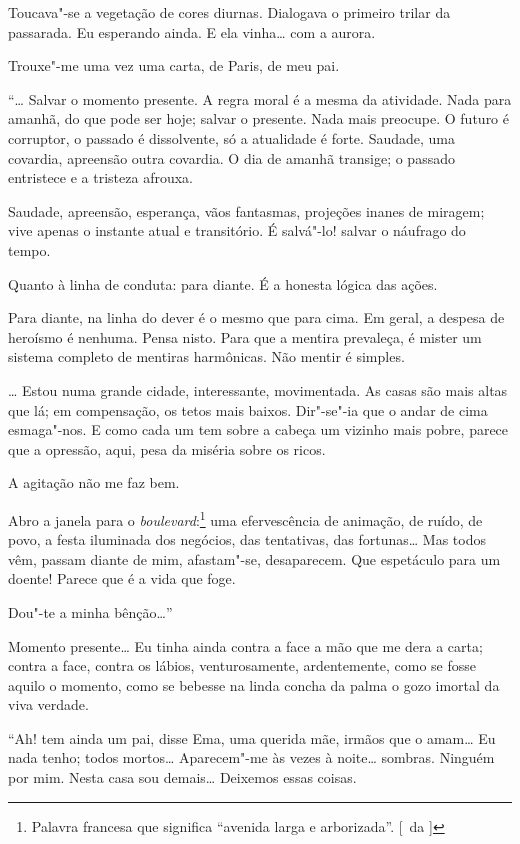 Toucava"-se a vegetação de cores diurnas. Dialogava o primeiro trilar da passarada.
Eu esperando ainda. E ela vinha\ldots{} com a aurora. 

Trouxe"-me uma vez uma carta, de Paris, de meu pai. 

``\ldots{} Salvar o momento presente. A regra moral é a
mesma da atividade. Nada para amanhã, do que pode ser hoje; salvar o
presente. Nada mais preocupe. O futuro é corruptor, o passado é
dissolvente, só a atualidade é forte. Saudade, uma covardia, apreensão
outra covardia. O dia de amanhã transige; o passado entristece e a
tristeza afrouxa. 

Saudade, apreensão, esperança, vãos fantasmas,
projeções inanes de miragem; vive apenas o instante atual e
transitório. É salvá"-lo! salvar o náufrago do tempo. 

Quanto à linha de conduta: para diante. É a honesta lógica das ações. 

Para diante, na
linha do dever é o mesmo que para cima. Em geral, a despesa de heroísmo
é nenhuma. Pensa nisto. Para que a mentira prevaleça, é mister um
sistema completo de mentiras harmônicas. Não mentir é simples. 

\ldots{} Estou numa grande cidade, interessante, movimentada. As casas são mais 
altas que lá; em compensação, os tetos mais baixos. Dir"-se"-ia que o andar
de cima esmaga"-nos. E como cada um tem sobre a cabeça um vizinho mais
pobre, parece que a opressão, aqui, pesa da miséria sobre os ricos. 

A agitação não me faz bem. 

Abro a janela para o \textit{boulevard}:\footnote{ Palavra francesa que significa 
``avenida larga e arborizada''. [~da ]} uma
efervescência de animação, de ruído, de povo, a festa iluminada dos
negócios, das tentativas, das fortunas\ldots{} Mas todos vêm, passam diante
de mim, afastam"-se, desaparecem. Que espetáculo para um doente!
Parece que é a vida que foge. 

Dou"-te a minha bênção\ldots{}'' 

Momento presente\ldots{} Eu tinha ainda contra a face a mão que me dera a carta;
contra a face, contra os lábios, venturosamente, ardentemente, como se
fosse aquilo o momento, como se bebesse na linda concha da palma o gozo
imortal da viva verdade. 

``Ah! tem ainda um pai, disse Ema, uma querida
mãe, irmãos que o amam\ldots{} Eu nada tenho; todos mortos\ldots{} Aparecem"-me
às vezes à noite\ldots{} sombras. Ninguém por mim. Nesta casa sou demais\ldots{}
Deixemos essas coisas. 

